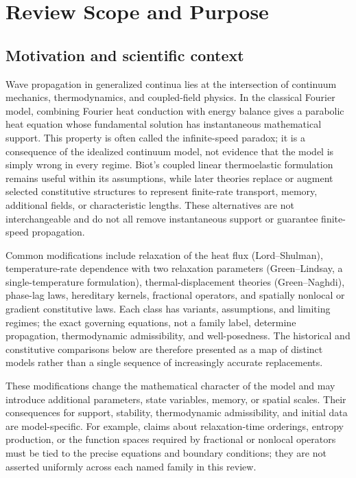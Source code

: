 \section{Review Scope and Purpose}
\label{sec:scope}

\subsection{Motivation and scientific context}

Wave propagation in generalized continua lies at the intersection of continuum mechanics, thermodynamics, and coupled-field physics. In the classical Fourier model, combining Fourier heat conduction with energy balance gives a parabolic heat equation whose fundamental solution has instantaneous mathematical support. This property is often called the infinite-speed paradox; it is a consequence of the idealized continuum model, not evidence that the model is simply wrong in every regime. Biot's coupled linear thermoelastic formulation remains useful within its assumptions, while later theories replace or augment selected constitutive structures to represent finite-rate transport, memory, additional fields, or characteristic lengths. These alternatives are not interchangeable and do not all remove instantaneous support or guarantee finite-speed propagation.

Common modifications include relaxation of the heat flux (Lord--Shulman), temperature-rate dependence with two relaxation parameters (Green--Lindsay, a single-temperature formulation), thermal-displacement theories (Green--Naghdi), phase-lag laws, hereditary kernels, fractional operators, and spatially nonlocal or gradient constitutive laws. Each class has variants, assumptions, and limiting regimes; the exact governing equations, not a family label, determine propagation, thermodynamic admissibility, and well-posedness. The historical and constitutive comparisons below are therefore presented as a map of distinct models rather than a single sequence of increasingly accurate replacements.

These modifications change the mathematical character of the model and may introduce additional parameters, state variables, memory, or spatial scales. Their consequences for support, stability, thermodynamic admissibility, and initial data are model-specific. For example, claims about relaxation-time orderings, entropy production, or the function spaces required by fractional or nonlocal operators must be tied to the precise equations and boundary conditions; they are not asserted uniformly across each named family in this review.

